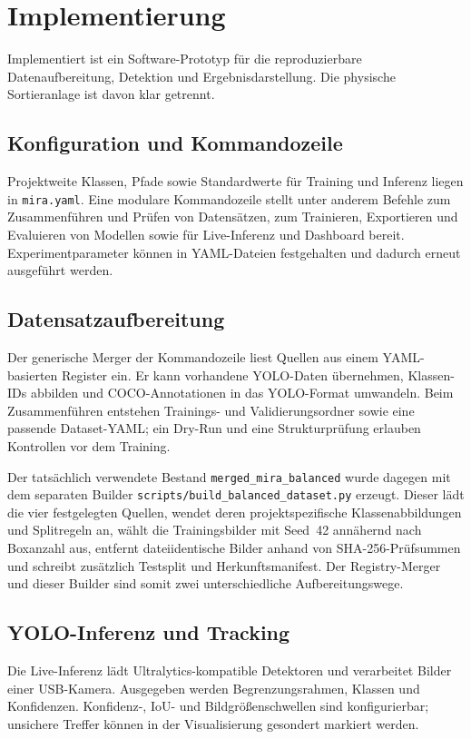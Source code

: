 \section{Implementierung}

Implementiert ist ein Software-Prototyp für die reproduzierbare Datenaufbereitung, Detektion und Ergebnisdarstellung. Die physische Sortieranlage ist davon klar getrennt.

\subsection{Konfiguration und Kommandozeile}
Projektweite Klassen, Pfade sowie Standardwerte für Training und Inferenz liegen in \texttt{mira.yaml}. Eine modulare Kommandozeile stellt unter anderem Befehle zum Zusammenführen und Prüfen von Datensätzen, zum Trainieren, Exportieren und Evaluieren von Modellen sowie für Live-Inferenz und Dashboard bereit. Experimentparameter können in YAML-Dateien festgehalten und dadurch erneut ausgeführt werden.

\subsection{Datensatzaufbereitung}
Der generische Merger der Kommandozeile liest Quellen aus einem YAML-basierten Register ein. Er kann vorhandene YOLO-Daten übernehmen, Klassen-IDs abbilden und COCO-Annotationen in das YOLO-Format umwandeln. Beim Zusammenführen entstehen Trainings- und Validierungsordner sowie eine passende Dataset-YAML; ein Dry-Run und eine Strukturprüfung erlauben Kontrollen vor dem Training.

Der tatsächlich verwendete Bestand \texttt{merged\_mira\_balanced} wurde dagegen mit dem separaten Builder \texttt{scripts/build\_balanced\_dataset.py} erzeugt. Dieser lädt die vier festgelegten Quellen, wendet deren projektspezifische Klassenabbildungen und Splitregeln an, wählt die Trainingsbilder mit Seed~42 annähernd nach Boxanzahl aus, entfernt dateiidentische Bilder anhand von SHA-256-Prüfsummen und schreibt zusätzlich Testsplit und Herkunftsmanifest. Der Registry-Merger und dieser Builder sind somit zwei unterschiedliche Aufbereitungswege.

\subsection{YOLO-Inferenz und Tracking}
Die Live-Inferenz lädt Ultralytics-kompatible Detektoren und verarbeitet Bilder einer USB-Kamera. Ausgegeben werden Begrenzungsrahmen, Klassen und Konfidenzen. Konfidenz-, IoU- und Bildgrößenschwellen sind konfigurierbar; unsichere Treffer können in der Visualisierung gesondert markiert werden.

